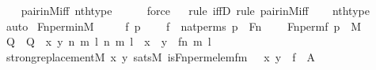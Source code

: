 \begin{isabellebody}
\ \ \isamarkupfalse%
\ pair{\isacharunderscore}{\kern0pt}in{\isacharunderscore}{\kern0pt}M{\isacharunderscore}{\kern0pt}iff\ nth{\isacharunderscore}{\kern0pt}type\ \isanewline
\ \ \ \isamarkupfalse%
\ force\isanewline
\ \ \isamarkupfalse%
{\isacharparenleft}{\kern0pt}rule\ iffD{}{\isacharcomma}{\kern0pt}\ rule\ pair{\isacharunderscore}{\kern0pt}in{\isacharunderscore}{\kern0pt}M{\isacharunderscore}{\kern0pt}iff{\isacharparenright}{\kern0pt}\isanewline
\ \ \isamarkupfalse%
\ nth{\isacharunderscore}{\kern0pt}type\ \isanewline
\ \ \isamarkupfalse%
\ auto%
\endisatagproof
{\isafoldproof}%
%
\isadelimproof
\isanewline
%
\endisadelimproof
\isanewline
{}\isamarkupfalse%
\ Fn{\isacharunderscore}{\kern0pt}perm{\isacharunderscore}{\kern0pt}in{\isacharunderscore}{\kern0pt}M\ {\isacharcolon}{\kern0pt}\ \isanewline
\ \ \ f\ p\ \isanewline
\ \ \ {\isachardoublequoteopen}f\ {\isasymin}\ nat{\isacharunderscore}{\kern0pt}perms{\isachardoublequoteclose}\ {\isachardoublequoteopen}p\ {\isasymin}\ Fn{\isachardoublequoteclose}\ \isanewline
\ \ \ {\isachardoublequoteopen}Fn{\isacharunderscore}{\kern0pt}perm{\isacharparenleft}{\kern0pt}f{\isacharcomma}{\kern0pt}\ p{\isacharparenright}{\kern0pt}\ {\isasymin}\ M{\isachardoublequoteclose}\ \isanewline
%
\isadelimproof
\isanewline
%
\endisadelimproof
%
\isatagproof
{}\isamarkupfalse%
\ {\isacharminus}{\kern0pt}\ \isanewline
\ \ \isamarkupfalse%
\ Q\ \ {\isachardoublequoteopen}Q\ {\isasymequiv}\ {\isasymlambda}x\ y{\isachardot}{\kern0pt}\ {\isasymexists}n\ m\ l{\isachardot}{\kern0pt}\ {\isacharless}{\kern0pt}{\isacharless}{\kern0pt}n{\isacharcomma}{\kern0pt}\ m{\isachargreater}{\kern0pt}{\isacharcomma}{\kern0pt}\ l{\isachargreater}{\kern0pt}\ {\isacharequal}{\kern0pt}\ x\ {\isasymand}\ y\ {\isacharequal}{\kern0pt}\ {\isacharless}{\kern0pt}{\isacharless}{\kern0pt}f{\isacharbackquote}{\kern0pt}n{\isacharcomma}{\kern0pt}\ m{\isachargreater}{\kern0pt}{\isacharcomma}{\kern0pt}\ l{\isachargreater}{\kern0pt}{\isachardoublequoteclose}\ \isanewline
\isanewline
\ \ \isamarkupfalse%
\ {\isachardoublequoteopen}strong{\isacharunderscore}{\kern0pt}replacement{\isacharparenleft}{\kern0pt}{\isacharhash}{\kern0pt}{\isacharhash}{\kern0pt}M{\isacharcomma}{\kern0pt}\ {\isasymlambda}x\ y{\isachardot}{\kern0pt}\ sats{\isacharparenleft}{\kern0pt}M{\isacharcomma}{\kern0pt}\ is{\isacharunderscore}{\kern0pt}Fn{\isacharunderscore}{\kern0pt}perm{\isacharunderscore}{\kern0pt}elem{\isacharunderscore}{\kern0pt}fm{\isacharparenleft}{\kern0pt}{}{\isacharcomma}{\kern0pt}\ {}{\isacharcomma}{\kern0pt}\ {}{\isacharparenright}{\kern0pt}{\isacharcomma}{\kern0pt}\ {\isacharbrackleft}{\kern0pt}x{\isacharcomma}{\kern0pt}\ y{\isacharbrackright}{\kern0pt}\ {\isacharat}{\kern0pt}\ {\isacharbrackleft}{\kern0pt}f{\isacharbrackright}{\kern0pt}{\isacharparenright}{\kern0pt}{\isacharparenright}{\kern0pt}{\isachardoublequoteclose}\ {\isacharparenleft}{\kern0pt}\ {\isacharquery}{\kern0pt}A{\isacharparenright}{\kern0pt}\isanewline

\end{isabellebody}
